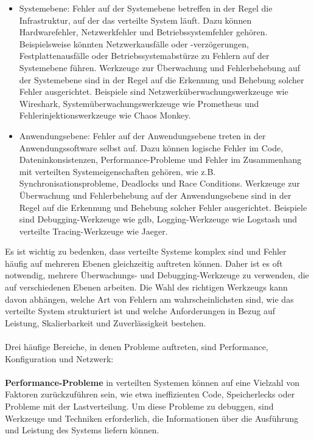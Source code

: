 \documentclass[../vs-script-first-v01.tex]{subfiles}
\begin{document}
\begin{itemize}
\item Systemebene: Fehler auf der Systemebene betreffen in der Regel die Infrastruktur, auf der das verteilte System läuft. Dazu können Hardwarefehler, Netzwerkfehler und Betriebssystemfehler gehören. Beispielsweise könnten Netzwerkausfälle oder -verzögerungen, Festplattenausfälle oder Betriebssystemabstürze zu Fehlern auf der Systemebene führen. Werkzeuge zur Überwachung und Fehlerbehebung auf der Systemebene sind in der Regel auf die Erkennung und Behebung solcher Fehler ausgerichtet. Beispiele sind Netzwerküberwachungswerkzeuge wie Wireshark, Systemüberwachungswerkzeuge wie Prometheus und Fehlerinjektionswerkzeuge wie Chaos Monkey.
\item Anwendungsebene: Fehler auf der Anwendungsebene treten in der Anwendungssoftware selbst auf. Dazu können logische Fehler im Code, Dateninkonsistenzen, Performance-Probleme und Fehler im Zusammenhang mit verteilten Systemeigenschaften gehören, wie z.B. Synchronisationsprobleme, Deadlocks und Race Conditions. Werkzeuge zur Überwachung und Fehlerbehebung auf der Anwendungsebene sind in der Regel auf die Erkennung und Behebung solcher Fehler ausgerichtet. Beispiele sind Debugging-Werkzeuge wie gdb, Logging-Werkzeuge wie Logstash und verteilte Tracing-Werkzeuge wie Jaeger.
\end{itemize}
Es ist wichtig zu bedenken, dass verteilte Systeme komplex sind und Fehler häufig auf mehreren Ebenen gleichzeitig auftreten können. Daher ist es oft notwendig, mehrere Überwachungs- und Debugging-Werkzeuge zu verwenden, die auf verschiedenen Ebenen arbeiten. Die Wahl des richtigen Werkzeugs kann davon abhängen, welche Art von Fehlern am wahrscheinlichsten sind, wie das verteilte System strukturiert ist und welche Anforderungen in Bezug auf Leistung, Skalierbarkeit und Zuverlässigkeit bestehen.
\\\\
Drei häufige Bereiche, in denen Probleme auftreten, sind Performance, Konfiguration und Netzwerk:
\\\\
\textbf{Performance-Probleme} in verteilten Systemen können auf eine Vielzahl von Faktoren zurückzuführen sein, wie etwa ineffizienten Code, Speicherlecks oder Probleme mit der Lastverteilung. Um diese Probleme zu debuggen, sind Werkzeuge und Techniken erforderlich, die Informationen über die Ausführung und Leistung des Systems liefern können.
\\\\
\end{document}
